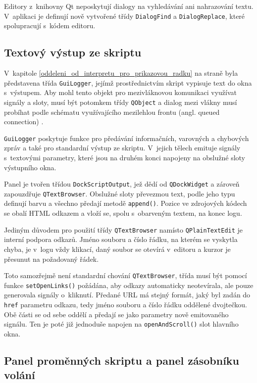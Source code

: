\documentclass[11pt,twoside,a4paper]{book}
\begin{document}
Editory z~knihovny Qt neposkytují dialogy na vyhledávání ani nahrazování textu. V~aplikaci je definují nově vytvořené třídy \texttt{DialogFind} a \texttt{DialogReplace}, které spolupracují s~kódem editoru.


\subsection{Textový výstup ze skriptu}

V~kapitole \ref{oddeleni_od_interpretu_pro_prikazovou_radku} na straně \pageref{oddeleni_od_interpretu_pro_prikazovou_radku} byla představena třída \texttt{GuiLogger}, jejímž prostřednictvím skript vypisuje text do okna s~výstupem. Aby mohl tento objekt pro mezivláknovou komunikaci využívat signály a sloty, musí být potomkem třídy \texttt{QObject} a dialog mezi vlákny musí probíhat podle schématu využívajícího mezilehlou frontu (angl. queued connection) \cite{qt_threads}.

\texttt{GuiLogger} poskytuje funkce pro předávání informačních, varovných a chybových zpráv a také pro standardní výstup ze skriptu. V~jejich tělech emituje signály s~textovými parametry, které jsou na druhém konci napojeny na obslužné sloty výstupního okna.

Panel je tvořen třídou \texttt{DockScriptOutput}, jež dědí od \texttt{QDockWidget} a zároveň zapouzdřuje \texttt{QTextBrowser}. Obslužné sloty převezmou text, podle jeho typu definují barvu a všechno předají metodě \texttt{append()}. Pozice ve zdrojových kódech se obalí HTML odkazem a vloží se, spolu s~obarveným textem, na konec logu.

Jediným důvodem pro použití třídy \texttt{QTextBrowser} namísto \texttt{QPlainTextEdit} je interní podpora odkazů. Jméno souboru a číslo řádku, na kterém se vyskytla chyba, je v~logu vždy klikací, daný soubor se otevírá v~editoru a kurzor je přesunut na požadovaný řádek.

Toto samozřejmě není standardní chování \texttt{QTextBrowser}, třída musí být pomocí funkce \texttt{set\-Open\-Links()} požádána, aby odkazy automaticky neotevírala, ale pouze generovala signály o~kliknutí. Předané URL má stejný formát, jaký byl zadán do \texttt{href} parametru odkazu, tedy jméno souboru a číslo řádku oddělené dvojtečkou. Obě části se od sebe oddělí a předají se jako parametry nově emitovaného signálu. Ten je poté již jednoduše napojen na \texttt{openAndScroll()} slot hlavního okna.


\subsection{Panel proměnných skriptu a panel zásobníku volání}
\end{document}
